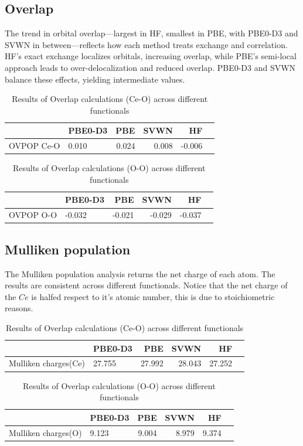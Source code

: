 \documentclass{article}
\begin{document}
\subsection{Overlap}

The trend in orbital overlap—largest in HF, smallest in PBE, with PBE0-D3 and SVWN in between—reflects how each method treats exchange and correlation. HF's exact exchange localizes orbitals, increasing overlap, while PBE's semi-local approach leads to over-delocalization and reduced overlap. PBE0-D3 and SVWN balance these effects, yielding intermediate values.

\begin{table}[H]
	\centering
	\begin{tabular}{llrrrr}
		\toprule
		 & PBE0-D3 & PBE & SVWN & HF \\
		\midrule
		OVPOP Ce-O & 0.010 & 0.024 & 0.008 & -0.006 \\
	\end{tabular}	
	\caption{Results of Overlap calculations (Ce-O) across different functionals}
	\label{tab:overlap_Ce_O}
\end{table}
\begin{table}[H]
	\centering
	\begin{tabular}{llrrrr}
		\toprule
		 & PBE0-D3 & PBE & SVWN & HF \\
		\midrule
		OVPOP O-O & -0.032 & -0.021 & -0.029 & -0.037 \\
	\end{tabular}	
	\caption{Results of Overlap calculations (O-O) across different functionals}
	\label{tab:overlap_O_O}
\end{table}

\subsection{Mulliken population}

The Mulliken population analysis returns the net charge of each atom. The results are consistent across different functionals. Notice that the net charge of the $Ce$ is halfed respect to it's atomic number, this is due to stoichiometric reasons.

\begin{table}[H]
	\centering
	\begin{tabular}{llrrrr}
		\toprule
		 & PBE0-D3 & PBE & SVWN & HF \\
		\midrule
		Mulliken charges(Ce) & 27.755 & 27.992 & 28.043 & 27.252 \\
	\end{tabular}	
	\caption{Results of Overlap calculations (Ce-O) across different functionals}
	\label{tab:mulliken_Ce}
\end{table}
\begin{table}[H]
	\centering
	\begin{tabular}{llrrrr}
		\toprule
		& PBE0-D3 & PBE & SVWN & HF \\
		\midrule
		Mulliken charges(O) & 9.123 & 9.004 & 8.979 & 9.374 \\
	\end{tabular}	
	\caption{Results of Overlap calculations (O-O) across different functionals}
	\label{tab:mulliken_O}
\end{table}
\end{document}
